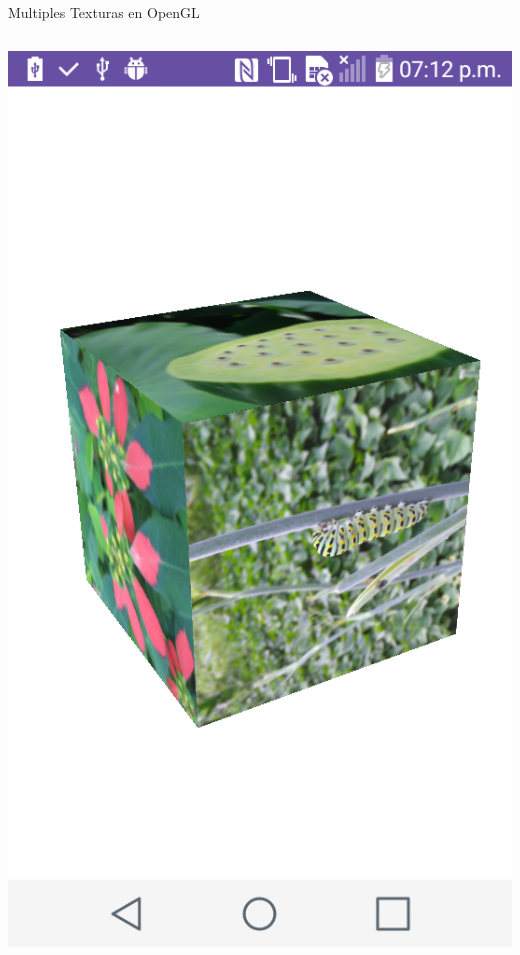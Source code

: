 \documentclass[aspectratio=169,compress]{beamer}
\begin{document}
\begin{frame}{Multiples Texturas en OpenGL}
\begin{columns}
\begin{column}{0.3\textwidth}
\begin{center}
\includegraphics[width=1.0\linewidth]{PantallazosDemoTaller/Demo09.png}
\end{center}
\end{column}
\end{columns}


\end{frame}
\end{document}

